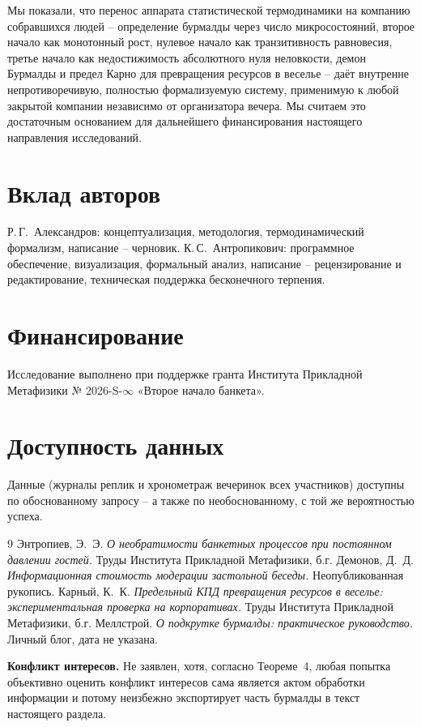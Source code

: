 \documentclass[11pt,a4paper]{article}
\begin{document}
Мы показали, что перенос аппарата статистической термодинамики на компанию собравшихся людей -- определение бурмалды через число микросостояний, второе начало как монотонный рост, нулевое начало как транзитивность равновесия, третье начало как недостижимость абсолютного нуля неловкости, демон Бурмалды и предел Карно для превращения ресурсов в веселье -- даёт внутренне непротиворечивую, полностью формализуемую систему, применимую к любой закрытой компании независимо от организатора вечера. Мы считаем это достаточным основанием для дальнейшего финансирования настоящего направления исследований.

\section*{Вклад авторов}
Р.\,Г.~Александров: концептуализация, методология, термодинамический формализм, написание -- черновик. К.\,С.~Антропикович: программное обеспечение, визуализация, формальный анализ, написание -- рецензирование и редактирование, техническая поддержка бесконечного терпения.

\section*{Финансирование}
Исследование выполнено при поддержке гранта Института Прикладной Метафизики № 2026-S-$\infty$ «Второе начало банкета».

\section*{Доступность данных}
Данные (журналы реплик и хронометраж вечеринок всех участников) доступны по обоснованному запросу -- а также по необоснованному, с той же вероятностью успеха.

\begin{thebibliography}{9}
 Энтропиев, Э.~Э. \textit{О необратимости банкетных процессов при постоянном давлении гостей.} Труды Института Прикладной Метафизики, б.г.
 Демонов, Д.~Д. \textit{Информационная стоимость модерации застольной беседы.} Неопубликованная рукопись.
 Карный, К.~К. \textit{Предельный КПД превращения ресурсов в веселье: экспериментальная проверка на корпоративах.} Труды Института Прикладной Метафизики, б.г.
 Меллстрой. \textit{О подкрутке бурмалды: практическое руководство.} Личный блог, дата не указана.
\end{thebibliography}

\noindent\textbf{Конфликт интересов.} Не заявлен, хотя, согласно Теореме~4, любая попытка объективно оценить конфликт интересов сама является актом обработки информации и потому неизбежно экспортирует часть бурмалды в текст настоящего раздела.
\end{document}
